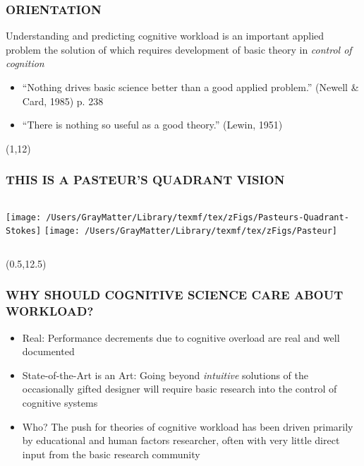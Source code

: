 \documentclass{beamer}
\begin{document}
 \begin{frame}
	\frametitle{ORIENTATION}
 Understanding and predicting cognitive workload is an important applied problem the solution of which requires development of basic theory in \emph{control of cognition}
		\begin{itemize}
			\item ``Nothing drives basic science better than a good applied problem.'' (Newell \& Card, 1985)  p. 238
			\item ``There is nothing so useful as a good theory.'' (Lewin, 1951)
		\end{itemize}
	\begin{textblock}{9}(1,12)
		\begin{alertblock}{}
			\tiny{}
		\end{alertblock}
	\end{textblock}

\end{frame}

\begin{frame}
	\frametitle{THIS IS A PASTEUR'S QUADRANT VISION}
	\begin{columns}
	\column{0.3\textwidth}
		\texttt{[image: /Users/GrayMatter/Library/texmf/tex/zFigs/Pasteurs-Quadrant-Stokes]}
	\column{0.7\textwidth}
		\texttt{[image: /Users/GrayMatter/Library/texmf/tex/zFigs/Pasteur]}
	\end{columns}
	\begin{textblock}{4}(0.5,12.5)
		\begin{alertblock}{}
			\tiny{\fullcite{stokes97}}
		\end{alertblock}
	\end{textblock}

\end{frame}

 \begin{frame}
	\frametitle{WHY SHOULD COGNITIVE SCIENCE CARE ABOUT WORKLOAD?}
	\begin{itemize}
		\item Real: Performance decrements due to cognitive overload are real and well documented
		\item State-of-the-Art is an Art: Going beyond \emph{intuitive} solutions of the occasionally gifted designer will require basic research into the control of cognitive systems
		\item Who? The push for theories of cognitive workload has been driven primarily by educational and human factors researcher, often with very little direct input from the basic research community
	\end{itemize}
\end{frame}
\end{document}
